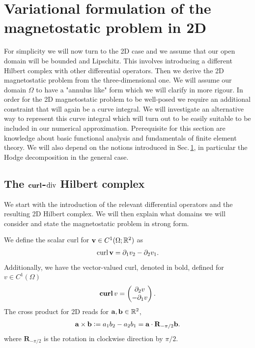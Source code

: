 \documentclass[../master_thesis.tex]{subfiles}
\begin{document}
\section{Variational formulation of the magnetostatic problem in 2D} 

For simplicity we will now turn to the 2D case and we assume that 
our open domain will be bounded and Lipschitz. This involves introducing
a different Hilbert complex with other differential operators. Then we 
derive the 2D magnetostatic problem from the three-dimensional one. 
We will assume our domain $\Omega$ to have a "annulus like" form which we 
will clarify in more rigour. In order for the 2D magnetostatic problem to be well-posed 
we require an additional constraint that will again be a curve integral. 
We will investigate an alternative way to represent this curve integral 
which will turn out to be easily suitable to be included in our numerical 
approximation. Prerequisite for this section are knowledge about basic functional analysis 
and fundamentals of finite element theory. We will also depend on the 
notions introduced in Sec.\,\ref{}, in particular the Hodge decomposition in the general 
case.

\subsection{The $\veccurl$-$\operatorname{div}$ Hilbert complex}\label{sec:variational_formulation_of_the_magnetostatic_problem_in_2D}


We start with the introduction of the relevant differential operators and 
the resulting 2D Hilbert complex. We will then explain what domains we will consider 
and state the magnetostatic problem in strong form.

We define the scalar curl for $\mathbf{v} \in C^1(\Omega;\mathbb{R}^2)$ as
\begin{align*}
    \operatorname{curl} \mathbf{v} = \partial_1 v_2 - \partial_2 v_1.
\end{align*}
Additionally, we have the vector-valued curl, denoted in bold, defined 
for $v \in C^1(\Omega)$
\begin{align*}
    \veccurl v = \begin{pmatrix}\partial_2 v \\ -\partial_1 v    \end{pmatrix}.
\end{align*}
The cross product for 2D reads for $\mathbf{a}, \mathbf{b} \in \mathbb{R}^2$,
\begin{align*}
    \mathbf{a} \times \mathbf{b} \vcentcolon= a_1 b_2- a_2 b_1 
    = \mathbf{a} \cdot \mathbf{R}_{-\pi/2}\mathbf{b}.
\end{align*}
where $\mathbf{R}_{-\pi/2}$ is the rotation in clockwise direction by $\pi/2$.
\end{document}
